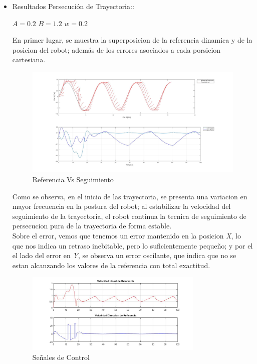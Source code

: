 \documentclass[a4paper,twoside]{article}
\begin{document}
\newpage	
	\begin{itemize}
		
		\item Resultados Persecución de Trayectoria::
	\begin{center}
		$A=0.2$    \hspace{0.2cm}   
		$B=1.2$    \hspace{0.2cm} 
		$w=0.2$ \\
	\end{center}

	En primer lugar, se muestra la superposicion de la referencia dinamica y de la posicion del 
	robot; además de los errores asociados a cada porsicion cartesiana.\\


	\begin{figure}[h!]
		\centering
		\includegraphics[width=1\textwidth]{PurePursuitSeguimiento_Error}
		\caption{Referencia Vs Seguimiento}
	\end{figure}

	Como se observa, en el inicio de las trayectoria, se presenta una variacion en mayor frecuencia
	en la postura del robot; al estabilizar la velocidad del seguimiento de la trayectoria,
	el robot continua la tecnica de seguimiento de persecucion pura de la trayectoria de forma estable.\\

	Sobre el error, vemos que tenemos un error mantenido  en la posicion \textit{X}, lo que 
	nos indica un retraso inebitable, pero lo suficientemente pequeño; y por el el lado del error 
	en \textit{Y}, se observa un error oscilante, que indica que no se estan alcanzando los valores de la referencia
	con total exactitud.
	\begin{figure}[h!]
		\centering
		\includegraphics[width=0.8\textwidth]{PurePursuitValoresEntrada}
		\caption{Señales de Control}
	\end{figure}


\end{itemize}
\end{document}
